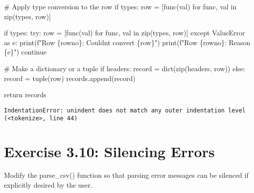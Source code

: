 \documentclass[
  letterpaper,
  DIV=11,
  numbers=noendperiod]{scrreprt}
\newenvironment{Shaded}{\begin{snugshade}}{\end{snugshade}}
\newcommand{\BuiltInTok}[1]{\textcolor[rgb]{0.00,0.46,0.62}{#1}}
\newcommand{\CommentTok}[1]{\textcolor[rgb]{0.37,0.37,0.37}{#1}}
\newcommand{\ControlFlowTok}[1]{\textcolor[rgb]{0.00,0.46,0.62}{#1}}
\newcommand{\ImportTok}[1]{\textcolor[rgb]{0.00,0.46,0.62}{#1}}
\newcommand{\KeywordTok}[1]{\textcolor[rgb]{0.00,0.46,0.62}{#1}}
\newcommand{\NormalTok}[1]{\textcolor[rgb]{0.00,0.46,0.62}{#1}}
\newcommand{\OperatorTok}[1]{\textcolor[rgb]{0.37,0.37,0.37}{#1}}
\newcommand{\PreprocessorTok}[1]{\textcolor[rgb]{0.68,0.00,0.00}{#1}}
\newcommand{\SpecialCharTok}[1]{\textcolor[rgb]{0.37,0.37,0.37}{#1}}
\newcommand{\SpecialStringTok}[1]{\textcolor[rgb]{0.13,0.47,0.30}{#1}}
\begin{document}
\begin{Shaded}
\begin{Highlighting}[]
            \CommentTok{\# Apply type conversion to the row}
            \ControlFlowTok{if}\NormalTok{ types:}
\NormalTok{                row }\OperatorTok{=}\NormalTok{ [func(val) }\ControlFlowTok{for}\NormalTok{ func, val }\KeywordTok{in} \BuiltInTok{zip}\NormalTok{(types, row)]}
        
            \ControlFlowTok{if}\NormalTok{ types:}
                \ControlFlowTok{try}\NormalTok{:}
\NormalTok{                    row }\OperatorTok{=}\NormalTok{ [func(val) }\ControlFlowTok{for}\NormalTok{ func, val }\KeywordTok{in} \BuiltInTok{zip}\NormalTok{(types, row)]}
                \ControlFlowTok{except} \PreprocessorTok{ValueError} \ImportTok{as}\NormalTok{ e:}
                        \BuiltInTok{print}\NormalTok{(}\SpecialStringTok{f"Row }\SpecialCharTok{\{}\NormalTok{rowno}\SpecialCharTok{\}}\SpecialStringTok{: Couldn\textquotesingle{}t convert }\SpecialCharTok{\{}\NormalTok{row}\SpecialCharTok{\}}\SpecialStringTok{"}\NormalTok{)}
                        \BuiltInTok{print}\NormalTok{(}\SpecialStringTok{f"Row }\SpecialCharTok{\{}\NormalTok{rowno}\SpecialCharTok{\}}\SpecialStringTok{: Reason }\SpecialCharTok{\{}\NormalTok{e}\SpecialCharTok{\}}\SpecialStringTok{"}\NormalTok{)}
                    \ControlFlowTok{continue}

            \CommentTok{\# Make a dictionary or a tuple}
            \ControlFlowTok{if}\NormalTok{ headers:}
\NormalTok{                record }\OperatorTok{=} \BuiltInTok{dict}\NormalTok{(}\BuiltInTok{zip}\NormalTok{(headers, row))}
            \ControlFlowTok{else}\NormalTok{:}
\NormalTok{                record }\OperatorTok{=} \BuiltInTok{tuple}\NormalTok{(row)}
\NormalTok{            records.append(record)}

        \ControlFlowTok{return}\NormalTok{ records}
\end{Highlighting}
\end{Shaded}

\begin{verbatim}
IndentationError: unindent does not match any outer indentation level (<tokenize>, line 44)
\end{verbatim}

\hypertarget{exercise-3.10-silencing-errors}{%
\section{Exercise 3.10: Silencing
Errors}\label{exercise-3.10-silencing-errors}}

Modify the parse\_csv() function so that parsing error messages can be
silenced if explicitly desired by the user.
\end{document}
